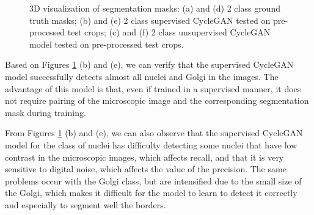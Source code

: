 \begin{figure}[!htb]
\hfil
{}\hfil
{} 

\caption{\ac{3D} visualization of segmentation masks: (a) and (d) 2 class ground truth masks; (b) and (e) 2 class supervised CycleGAN tested on pre-processed test crops; (c) and (f) 2 class unsupervised CycleGAN model tested on pre-processed test crops.}

\label{fig:results-cyclegan-2channel}

\end{figure}

Based on Figures \ref{fig:results-cyclegan-2channel} (b) and (e), we can verify that the supervised CycleGAN model successfully detects almost all nuclei and Golgi in the images. The advantage of this model is that, even if trained in a supervised manner, it does not require pairing of the microscopic image and the corresponding segmentation mask during training. 

From Figures \ref{fig:results-cyclegan-2channel} (b) and (e), we can also observe that the supervised CycleGAN model for the class of nuclei has difficulty detecting some nuclei that have low contrast in the microscopic images, which affects recall, and that it is very sensitive to digital noise, which affects the value of the precision. The same problems occur with the Golgi class, but are intensified due to the small size of the Golgi, which makes it difficult for the model to learn to detect it correctly and especially to segment well the borders.

